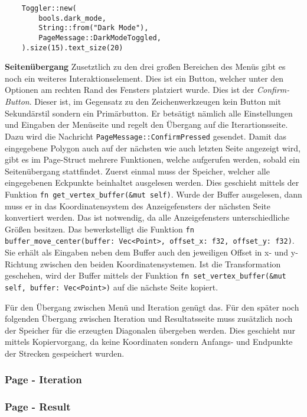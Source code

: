 \begin{lstlisting}
    Toggler::new(
        bools.dark_mode,
        String::from("Dark Mode"),
        PageMessage::DarkModeToggled,
    ).size(15).text_size(20)
\end{lstlisting}\pagebreak

\textbf{\large{Seitenübergang}}\linebreak
Zusetztlich zu den drei großen Bereichen des Menüs gibt es noch ein weiteres Interaktionselement. Dies ist ein Button, welcher unter den Optionen am rechten Rand des Fensters platziert wurde.
Dies ist der \emph{Confirm-Button}. Dieser ist, im Gegensatz zu den Zeichenwerkzeugen kein Button mit Sekundärstil sondern ein Primärbutton. Er betsätigt nämlich alle Einstellungen und Eingaben der Menüseite und
regelt den Übergang auf die Iterartionsseite. Dazu wird die Nachricht \lstinline{PageMessage::ConfirmPressed} gesendet. Damit das eingegebene Polygon auch auf der nächsten wie auch letzten Seite angezeigt wird, gibt es im Page-Struct
mehrere Funktionen, welche aufgerufen werden, sobald ein Seitenübergang stattfindet. Zuerst einmal muss der Speicher, welcher alle eingegebenen Eckpunkte beinhaltet ausgelesen werden. Dies geschieht mittels der Funktion 
\lstinline{fn get_vertex_buffer(&mut self)}. Wurde der Buffer ausgelesen, dann muss er in das Koordinatensystem des Anzeigefensters der nächsten Seite konvertiert werden. Das ist notwendig, da alle Anzeigefensters unterschiedliche Größen besitzen.
Das bewerkstelligt die Funktion \lstinline{fn buffer_move_center(buffer: Vec<Point>, offset_x: f32, offset_y: f32)}. Sie erhält als Eingaben neben dem Buffer auch den jeweiligen Offset in x- und y-Richtung
zwischen den beiden Koordinatensystemen. Ist die Transformation geschehen, wird der Buffer mittels der Funktion \lstinline{fn set_vertex_buffer(&mut self, buffer: Vec<Point>)} auf die nächste Seite kopiert.

Für den Übergang zwischen Menü und Iteration genügt das. Für den später noch folgenden Übergang zwischen Iteration und Resultatsseite muss zusätzlich noch der Speicher für die erzeugten Diagonalen übergeben werden.
Dies geschieht nur mittels Kopiervorgang, da keine Koordinaten sondern Anfangs- und Endpunkte der Strecken gespeichert wurden.

\subsubsection{Page - Iteration}
\subsubsection{Page - Result}
